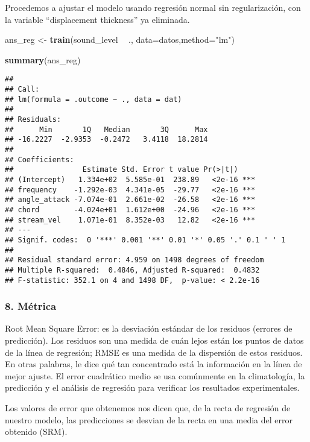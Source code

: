\documentclass[]{article}
\newenvironment{Shaded}{\begin{snugshade}}{\end{snugshade}}
\newcommand{\KeywordTok}[1]{\textcolor[rgb]{0.13,0.29,0.53}{\textbf{#1}}}
\newcommand{\DataTypeTok}[1]{\textcolor[rgb]{0.13,0.29,0.53}{#1}}
\newcommand{\StringTok}[1]{\textcolor[rgb]{0.31,0.60,0.02}{#1}}
\newcommand{\OperatorTok}[1]{\textcolor[rgb]{0.81,0.36,0.00}{\textbf{#1}}}
\newcommand{\NormalTok}[1]{#1}
\begin{document}
Procedemos a ajustar el modelo usando regresión normal sin
regularización, con la variable ``displacement thickness'' ya eliminada.

\begin{Shaded}
\begin{Highlighting}[]
\NormalTok{ans_reg <-}\StringTok{ }\KeywordTok{train}\NormalTok{(sound_level }\OperatorTok{~}\StringTok{ }\NormalTok{., }\DataTypeTok{data=}\NormalTok{datos,}\DataTypeTok{method=}\StringTok{"lm"}\NormalTok{)}

\KeywordTok{summary}\NormalTok{(ans_reg)}
\end{Highlighting}
\end{Shaded}

\begin{verbatim}
## 
## Call:
## lm(formula = .outcome ~ ., data = dat)
## 
## Residuals:
##      Min       1Q   Median       3Q      Max 
## -16.2227  -2.9353  -0.2472   3.4118  18.2814 
## 
## Coefficients:
##                Estimate Std. Error t value Pr(>|t|)    
## (Intercept)   1.334e+02  5.585e-01  238.89   <2e-16 ***
## frequency    -1.292e-03  4.341e-05  -29.77   <2e-16 ***
## angle_attack -7.074e-01  2.661e-02  -26.58   <2e-16 ***
## chord        -4.024e+01  1.612e+00  -24.96   <2e-16 ***
## stream_vel    1.071e-01  8.352e-03   12.82   <2e-16 ***
## ---
## Signif. codes:  0 '***' 0.001 '**' 0.01 '*' 0.05 '.' 0.1 ' ' 1
## 
## Residual standard error: 4.959 on 1498 degrees of freedom
## Multiple R-squared:  0.4846, Adjusted R-squared:  0.4832 
## F-statistic: 352.1 on 4 and 1498 DF,  p-value: < 2.2e-16
\end{verbatim}

\subsubsection{8. Métrica}\label{metrica-1}

Root Mean Square Error: es la desviación estándar de los residuos
(errores de predicción). Los residuos son una medida de cuán lejos están
los puntos de datos de la línea de regresión; RMSE es una medida de la
dispersión de estos residuos. En otras palabras, le dice qué tan
concentrado está la información en la línea de mejor ajuste. El error
cuadrático medio se usa comúnmente en la climatología, la predicción y
el análisis de regresión para verificar los resultados experimentales.

Los valores de error que obtenemos nos dicen que, de la recta de
regresión de nuestro modelo, las predicciones se desvian de la recta en
una media del error obtenido (SRM).
\end{document}
